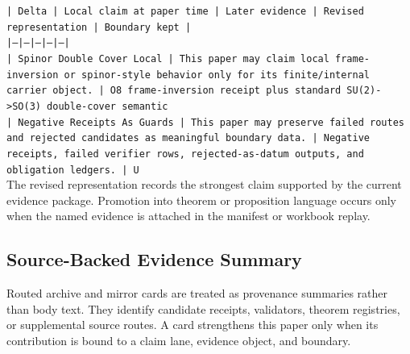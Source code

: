 \documentclass[11pt]{article}
\begin{document}
\noindent\texttt{| Delta | Local claim at paper time | Later evidence | Revised representation | Boundary kept |}\\
\noindent\texttt{|---|---|---|---|---|}\\
\noindent\texttt{| Spinor Double Cover Local | This paper may claim local frame-inversion or spinor-style behavior only for its finite/internal carrier object. | O8 frame-inversion receipt plus standard SU(2)->SO(3) double-cover semantic}\\
\noindent\texttt{| Negative Receipts As Guards | This paper may preserve failed routes and rejected candidates as meaningful boundary data. | Negative receipts, failed verifier rows, rejected-as-datum outputs, and obligation ledgers. | U}\\

The revised representation records the strongest claim supported by the current evidence package. Promotion into theorem or proposition language occurs only when the named evidence is attached in the manifest or workbook replay.

\subsection*{Source-Backed Evidence Summary}

Routed archive and mirror cards are treated as provenance summaries rather than
body text. They identify candidate receipts, validators, theorem registries, or
supplemental source routes. A card strengthens this paper only when its
contribution is bound to a claim lane, evidence object, and boundary.
\end{document}
